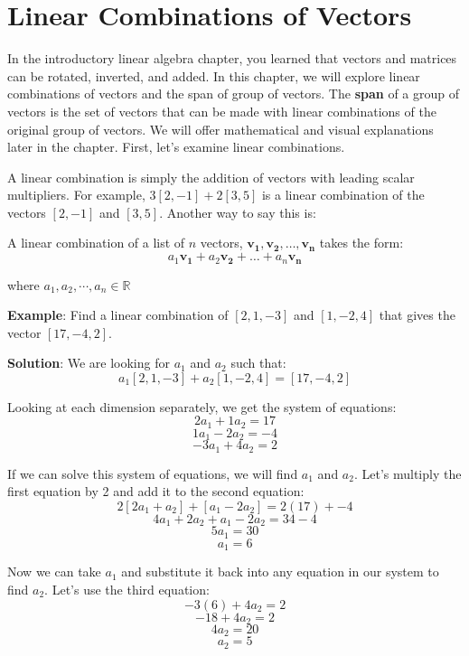 \chapter{Linear Combinations of Vectors}

In the introductory linear algebra chapter, you learned that vectors and 
matrices can be rotated, inverted, and added. In this chapter, we will explore 
linear combinations of vectors and the span of group of vectors. The 
\textbf{span} of a group of vectors is the set of vectors that can 
be made with linear combinations of the original group of vectors. We will 
offer mathematical and visual explanations later in the chapter. First, let's 
examine linear combinations. 

A linear combination is simply the addition of vectors with leading scalar 
multipliers. For example, $3 \left[ 2, -1 \right] + 2 \left[ 3, 5 \right]$ is 
a linear combination of the vectors $\left[ 2, -1 \right]$ and $\left[ 3, 5 
\right]$. Another way to say this is:
\begin{mdframed}[style = important, frametitle = {Linear Combination of 
Vectors}]
A linear combination of a list of $n$ vectors, $\mathbf{v_1}, \mathbf{v_2}, \dots, \mathbf{v_n}$ takes the form:
$$a_1 \mathbf{v_1} + a_2 \mathbf{v_2} + \dots + a_n \mathbf{v_n}$$

where $a_1, a_2, \cdots, a_n \in \mathbb{R}$
\end{mdframed}

\textbf{Example}: Find a linear combination of $\left[ 2, 1, -3 \right]$ and 
$\left[ 1, -2, 4 \right]$ that gives the vector $\left[ 17, -4, 2 \right]$.

\textbf{Solution}: We are looking for $a_1$ and $a_2$ such that:
$$a_1 \left[ 2, 1, -3 \right] + a_2 \left[ 1, -2, 4 \right] = \left[17, -4, 2 
\right]$$

Looking at each dimension separately, we get the system of equations:
$$2 a_1 + 1 a_2 = 17$$
$$1 a_1 - 2 a_2 = -4$$
$$-3 a_1 + 4 a_2 = 2$$

If we can solve this system of equations, we will find $a_1$ and $a_2$. Let's 
multiply the first equation by 2 and add it to the second equation:
$$2 \left[ 2 a_1 + a_2 \right] + \left[ a_1 - 2 a_2 \right] = 2 \left( 17 
\right) + -4$$
$$4 a_1 + 2 a_2 + a_1 - 2 a_2 = 34 - 4$$
$$5 a_1 = 30$$
$$a_1 = 6$$

Now we can take $a_1$ and substitute it back into any equation in our system 
to find $a_2$. Let's use the third equation:
$$-3 \left( 6 \right) + 4 a_2 = 2$$
$$ -18 + 4 a_2 = 2$$
$$4 a_2 = 20$$
$$a_2 = 5$$

